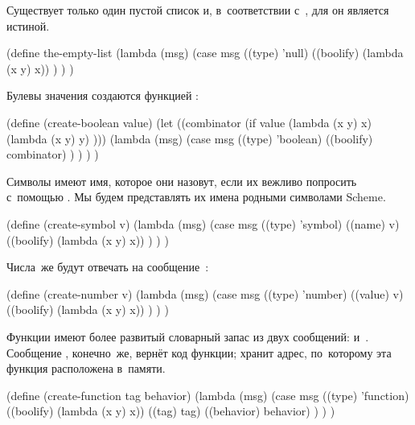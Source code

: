 Существует только один пустой список и, в~соответствии с~\RnRS, для  он
является истиной.

\begin{code:lisp}
(define the-empty-list
  (lambda (msg)
    (case msg
      ((type)    'null)
      ((boolify) (lambda (x y) x)) ) ) )
\end{code:lisp}

Булевы значения создаются функцией :

\begin{code:lisp}
(define (create-boolean value)
  (let ((combinator (if value (lambda (x y) x)
                              (lambda (x y) y) )))
    (lambda (msg)
      (case msg
        ((type)    'boolean)
        ((boolify) combinator) ) ) ) )
\end{code:lisp}

Символы имеют имя, которое они назовут, если их вежливо попросить с~помощью
. Мы будем представлять их имена родными символами Scheme.

\begin{code:lisp}
(define (create-symbol v)
  (lambda (msg)
    (case msg
      ((type)    'symbol)
      ((name)    v)
      ((boolify) (lambda (x y) x)) ) ) )
\end{code:lisp}

Числа~же будут отвечать на сообщение~:

\begin{code:lisp}
(define (create-number v)
  (lambda (msg)
    (case msg
      ((type)    'number)
      ((value)    v)
      ((boolify) (lambda (x y) x)) ) ) )
\end{code:lisp}

Функции имеют более развитый словарный запас из двух сообщений: 
и~. Сообщение , конечно~же, вернёт код функции;
 хранит адрес, по~которому эта функция расположена в~памяти.

\begin{code:lisp}
(define (create-function tag behavior)
  (lambda (msg)
    (case msg
      ((type)     'function)
      ((boolify)  (lambda (x y) x))
      ((tag)      tag)
      ((behavior) behavior) ) ) )
\end{code:lisp}

